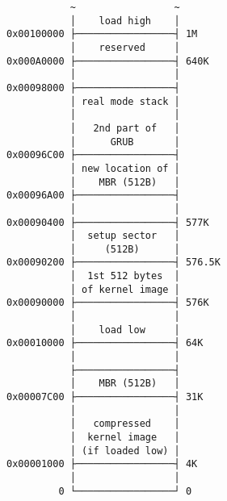 \documentclass[varwidth]{standalone}
\begin{document}
\begin{verbatim}
           ~                 ~ 
           │    load high    │
0x00100000 ├─────────────────┤ 1M
           │    reserved     │
0x000A0000 ├─────────────────┤ 640K
           │                 │ 
0x00098000 ├─────────────────┤
           │ real mode stack │
           │                 │
           │   2nd part of   │
           │      GRUB       │
0x00096C00 ├─────────────────┤
           │ new location of │
           │    MBR (512B)   │
0x00096A00 ├─────────────────┤
           │                 │
0x00090400 ├─────────────────┤ 577K
           │  setup sector   │
           │     (512B)      │
0x00090200 ├─────────────────┤ 576.5K
           │  1st 512 bytes  │
           │ of kernel image │
0x00090000 ├─────────────────┤ 576K
           │                 │
           │    load low     │
0x00010000 ├─────────────────┤ 64K
           │                 │ 
           ├─────────────────┤
           │    MBR (512B)   │
0x00007C00 ├─────────────────┤ 31K
           │                 │
           │   compressed    │
           │  kernel image   │
           │ (if loaded low) │
0x00001000 ├─────────────────┤ 4K
           │                 │
         0 └─────────────────┘ 0
\end{verbatim}
\end{document}
